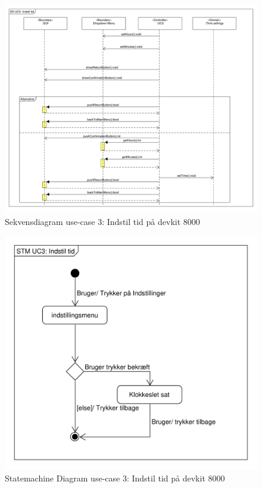\begin{figure}[H]
	\caption{Sekvensdiagram use-case 3: Indstil tid på devkit 8000}
	\label{SD:UC3-devkit}
	\includegraphics[scale=0.6,trim=10 400 100 0]{Applikationsmodel_UC3/SD_UC3}
\end{figure}

\begin{figure}[H]
	\caption{Statemachine Diagram use-case 3: Indstil tid på devkit 8000}
	\label{STD:UC3-devkit}
	\includegraphics[scale=0.7,trim=10 600 100 0, clip]{Applikationsmodel_UC3/Statemachine_UC3}
\end{figure}

